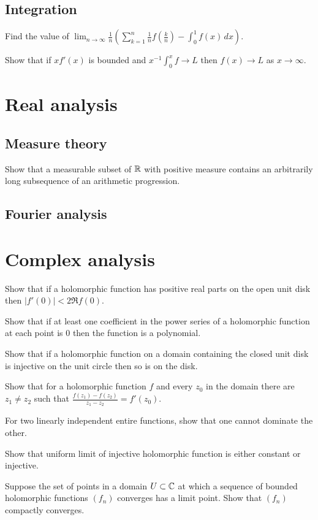 \documentclass[11pt]{report}
\let\realsection\section
\renewcommand\section{\realsection}
\begin{document}
\subsection{Integration}
\begin{cond}
\item Find the value of $\lim_{n\to\infty}\frac1n\left(\sum_{k=1}^n\frac1nf\left(\frac kn\right)-\int_0^1f(x)\,dx\right)$.
\item Show that if $xf'(x)$ is bounded and $x^{-1}\int_0^xf\to L$ then $f(x)\to L$ as $x\to\infty$.
\end{cond}


\section{Real analysis}
\subsection{Measure theory}
\begin{cond}
\item Show that a measurable subset of $\mathbb{R}$ with positive measure contains an arbitrarily long subsequence of an arithmetic progression.
\end{cond}
\subsection{Fourier analysis}

\section{Complex analysis}
\begin{cond}
\item Show that if a holomorphic function has positive real parts on the open unit disk then $|f'(0)|<2\Re f(0)$.
\item Show that if at least one coefficient in the power series of a holomorphic function at each point is 0 then the function is a polynomial.
\item Show that if a holomorphic function on a domain containing the closed unit disk is injective on the unit circle then so is on the disk.
\item Show that for a holomorphic function $f$ and every $z_0$ in the domain there are $z_1\ne z_2$ such that $\frac{f(z_1)-f(z_2)}{z_1-z_2}=f'(z_0)$.
\item For two linearly independent entire functions, show that one cannot dominate the other.
\item Show that uniform limit of injective holomorphic function is either constant or injective.
\item Suppose the set of points in a domain $U\subset\mathbb{C}$ at which a sequence of bounded holomorphic functions $(f_n)$ converges has a limit point. Show that $(f_n)$ compactly converges.
\end{cond}
\end{document}
